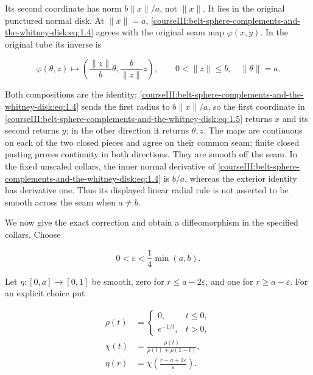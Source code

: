 Its second coordinate has norm \(b\|x\|/a\), not \(\|x\|\). It lies in the original punctured normal disk. At \(\|x\|=a\), \eqref{courseIII:belt-sphere-complements-and-the-whitney-disk:eq:1.4} agrees with the original seam map \(\varphi(x,y)\). In the original tube its inverse is

\begin{equation}
\varphi(\theta,z)\longmapsto
\left(\frac{\|z\|}{b}\theta,\frac b{\|z\|}z\right),
\qquad 0<\|z\|\leq b,\quad\|\theta\|=a.
\label{courseIII:belt-sphere-complements-and-the-whitney-disk:eq:1.5}
\end{equation}

Both compositions are the identity: \eqref{courseIII:belt-sphere-complements-and-the-whitney-disk:eq:1.4} sends the first radius to \(b\|x\|/a\), so the first coordinate in \eqref{courseIII:belt-sphere-complements-and-the-whitney-disk:eq:1.5} returns \(x\) and its second returns \(y\); in the other direction it returns \(\theta,z\). The maps are continuous on each of the two closed pieces and agree on their common seam; finite closed pasting proves continuity in both directions. They are smooth off the seam. In the fixed unscaled collars, the inner normal derivative of \eqref{courseIII:belt-sphere-complements-and-the-whitney-disk:eq:1.4} is \(b/a\), whereas the exterior identity has derivative one. Thus its displayed linear radial rule is not asserted to be smooth across the seam when \(a\ne b\).

We now give the exact correction and obtain a diffeomorphism in the specified collars. Choose

\begin{equation}
0<\varepsilon<\frac14\min(a,b).
\label{courseIII:belt-sphere-complements-and-the-whitney-disk:eq:1.6}
\end{equation}

Let \(\eta:[0,a]\to[0,1]\) be smooth, zero for \(r\leq a-2\varepsilon\), and one for \(r\geq a-\varepsilon\). For an explicit choice put

\begin{equation}
\begin{aligned}
\rho(t)&=
\begin{cases}0,&t\leq0,\\ e^{-1/t},&t>0,\end{cases}\\
\chi(t)&=\frac{\rho(t)}{\rho(t)+\rho(1-t)},\\
\eta(r)&=\chi\!\left(\frac{r-a+2\varepsilon}{\varepsilon}\right).
\end{aligned}
\label{courseIII:belt-sphere-complements-and-the-whitney-disk:eq:1.7}
\end{equation}

